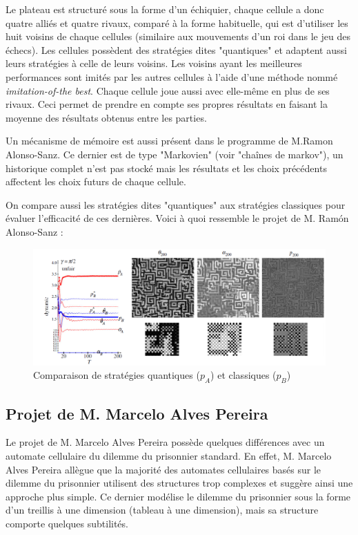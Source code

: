 \documentclass[a4paper]{article}
\begin{document}
Le plateau est structuré sous la forme d'un échiquier, chaque cellule a donc quatre alliés et quatre rivaux, comparé à la forme habituelle, qui est d'utiliser les huit voisins de chaque cellules (similaire aux mouvements d'un roi dans le jeu des échecs). Les cellules possèdent des stratégies dites "quantiques" et adaptent aussi leurs stratégies à celle de leurs voisins. Les voisins ayant les meilleures performances sont imités par les autres cellules à l'aide d'une méthode nommé \textit{imitation-of-the best}. Chaque cellule joue aussi avec elle-même en plus de ses rivaux. Ceci permet de prendre en compte ses propres résultats en faisant la moyenne des résultats obtenus entre les parties.

Un mécanisme de mémoire est aussi présent dans le programme de M.Ramon Alonso-Sanz. Ce dernier est de type "Markovien" (voir "chaînes de markov"), un historique complet n'est pas stocké mais les résultats et les choix précédents affectent les choix futurs de chaque cellule.

On compare aussi les stratégies dites "quantiques" aux stratégies classiques pour évaluer l'efficacité de ces dernières. Voici à quoi ressemble le projet de M. Ramón Alonso-Sanz :

\begin{figure}[htp]
    \centering
    \includegraphics[width=\linewidth]{quantum_automaton.png}
    \caption{Comparaison de stratégies quantiques ($p_A$) et classiques ($p_B$)}
\end{figure}

\pagebreak
\subsection{Projet de M. Marcelo Alves Pereira}
Le projet de M. Marcelo Alves Pereira possède quelques différences avec un automate cellulaire du dilemme du prisonnier standard. En effet, M. Marcelo Alves Pereira allègue que la majorité des automates cellulaires basés sur le dilemme du prisonnier utilisent des structures trop complexes et suggère ainsi une approche plus simple. Ce dernier modélise le dilemme du prisonnier sous la forme d'un treillis à une dimension (tableau à une dimension), mais sa structure comporte quelques subtilités.
\end{document}
